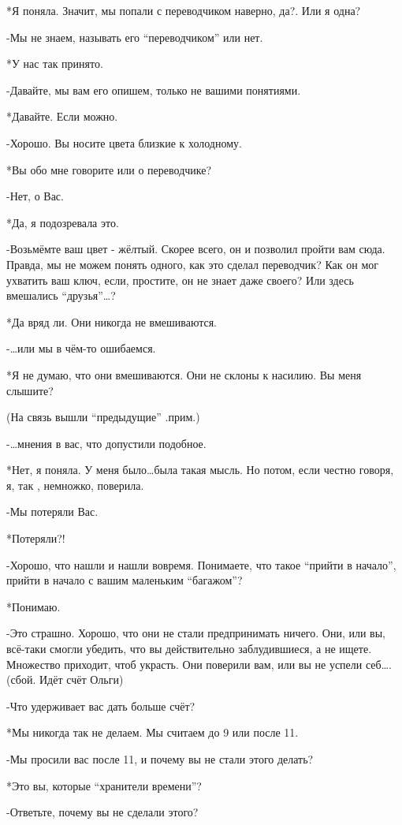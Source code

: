 *Я поняла. Значит, мы попали с переводчиком наверно, да?. Или я одна?

-Мы не знаем, называть его “переводчиком” или нет.

*У нас так принято.

-Давайте, мы вам его опишем, только не вашими понятиями.

*Давайте. Если можно.

-Хорошо. Вы носите цвета близкие к холодному.

*Вы обо мне говорите или о переводчике?

-Нет, о Вас.

*Да, я подозревала это.

-Возьмёмте ваш цвет - жёлтый. Скорее всего, он и позволил пройти вам сюда. Правда, мы не можем понять одного, как это сделал переводчик? Как он мог ухватить ваш ключ, если, простите, он не знает даже своего? Или здесь вмешались “друзья”…?

*Да вряд ли. Они никогда не вмешиваются.

-…или мы в чём-то ошибаемся.

*Я не думаю, что они вмешиваются. Они не склоны к насилию. Вы меня слышите?

(На связь вышли “предыдущие” .прим.)

-…мнения в вас, что допустили подобное.

*Нет, я поняла. У меня было…была такая мысль. Но потом, если честно говоря, я, так , немножко, поверила.

-Мы потеряли Вас. 

*Потеряли?!

-Хорошо, что нашли и нашли вовремя. Понимаете, что такое “прийти в начало”, прийти в начало с вашим маленьким “багажом”?

*Понимаю.

-Это страшно. Хорошо, что они не стали предпринимать ничего.  Они, или вы, всё-таки смогли убедить, что вы действительно заблудившиеся, а не ищете. Множество приходит, чтоб украсть. Они поверили вам, или вы не успели себ….
(сбой. Идёт счёт Ольги)

-Что удерживает вас дать больше счёт?

*Мы никогда так не делаем. Мы считаем до 9 или после 11.

-Мы просили вас после 11, и почему вы не стали этого делать?

*Это вы, которые “хранители времени”?

-Ответьте, почему вы не сделали этого?

